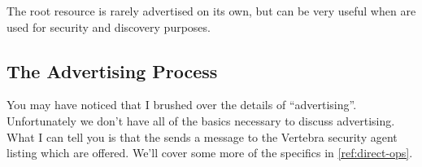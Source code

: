 The root resource is rarely advertised on its own, but can be very useful when \resources{} are used for security and discovery purposes.

\subsection{The Advertising Process}

You may have noticed that I brushed over the details of ``advertising''.  Unfortunately we don't have all of the basics necessary to discuss advertising.  What I can tell you is that the \agent{} sends a message to the Vertebra security agent listing which \resources{} are offered.  We'll cover some more of the specifics in \ref{ref:direct-ops}.


